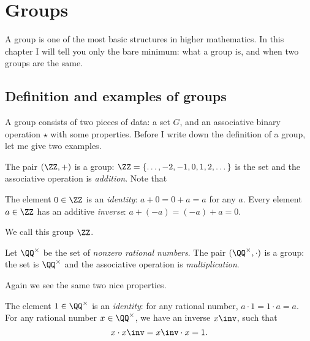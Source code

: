 \chapter{Groups}
\label{ch:group_intro}
A group is one of the most basic structures in higher mathematics.
In this chapter I will tell you only the bare minimum:
what a group is, and when two groups are the same.

\section{Definition and examples of groups}

A group consists of two pieces of data: a set $G$,
and an associative binary operation $\star$ with some properties.
Before I write down the definition of a group, let me give two examples.

\begin{example}
	The pair $(\ZZ, +)$ is a group:
	$\ZZ = \left\{ \dots,-2,-1,0,1,2,\dots \right\}$ is the set
	and the associative operation is \emph{addition}.
	Note that
	\begin{itemize}
		\ii The element $0 \in \ZZ$ is an \emph{identity}:
		$a+0=0+a = a$ for any $a$.
		\ii Every element $a \in \ZZ$ has an additive \emph{inverse}: $a + (-a) = (-a) + a = 0$.
	\end{itemize}
	We call this group $\ZZ$.
\end{example}
\begin{example}
	Let $\QQ^\times$ be the set of \emph{nonzero rational numbers}.
	The pair $(\QQ^\times, \cdot)$ is a group:
	the set is $\QQ^\times$
	and the associative operation is \emph{multiplication}.

	Again we see the same two nice properties.
	\begin{itemize}
		\ii The element $1 \in \QQ^\times$ is an \emph{identity}:
		for any rational number, $a \cdot 1 = 1 \cdot a = a$.
		\ii For any rational number $x \in \QQ^\times$,
		we have an inverse $x\inv$, such that
		\[ x \cdot x\inv = x\inv \cdot x = 1. \]
	\end{itemize}
\end{example}


